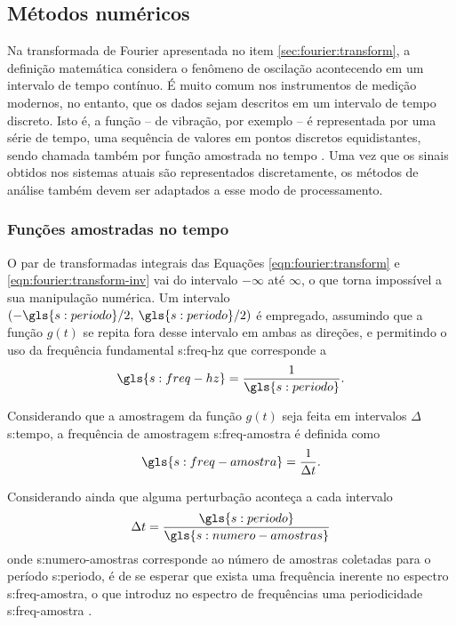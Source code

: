 \documentclass[12pt,oneside,english,brazil,lmodern,siglas,simbolos,cite=num]{ucsmonograph}
\begin{document}
	\subsection{Métodos numéricos}
	Na transformada de Fourier apresentada no item \ref{sec:fourier:transform}, a definição matemática considera o fenômeno de oscilação acontecendo em um intervalo de tempo contínuo.
	É muito comum nos instrumentos de medição modernos, no entanto, que os dados sejam descritos em um intervalo de tempo discreto.
	Isto é, a função -- de vibração, por exemplo -- é representada por uma série de tempo, uma sequência de valores em pontos discretos equidistantes, sendo chamada também por função amostrada no tempo \cite{dimarogonas:1995}.
	Uma vez que os sinais obtidos nos sistemas atuais são representados discretamente, os métodos de análise também devem ser adaptados a esse modo de processamento.
	
	\subsubsection{Funções amostradas no tempo}
	O par de transformadas integrais das Equações \ref{eqn:fourier:transform} e \ref{eqn:fourier:transform-inv} vai do intervalo $ -\infty $ até $ \infty $, o que torna impossível a sua manipulação numérica.
	Um intervalo $ (-\gls{s:periodo}/2,\:\gls{s:periodo}/2) $ é empregado, assumindo que a função $g(t)$ se repita fora desse intervalo em ambas as direções, e permitindo o uso da frequência fundamental \gls{s:freq-hz} que corresponde a \cite{dimarogonas:1995}
	\begin{equation} \label{eqn:fourier:freq-fundam}
		\gls{s:freq-hz} = \frac{1}{\gls{s:periodo}}.
	\end{equation}
	
	Considerando que a amostragem da função $g(t)$ seja feita em intervalos $ \Delta $\gls{s:tempo}, a frequência de amostragem \gls{s:freq-amostra} é definida como \cite{dimarogonas:1995}
	\begin{equation} \label{eqn:fourier:freq-amostra}
		\gls{s:freq-amostra} = \frac{1}{\Delta t}.
	\end{equation}
	
	Considerando ainda que alguma perturbação aconteça a cada intervalo \[\Delta t = \frac{\gls{s:periodo}}{\gls{s:numero-amostras}} \] onde \gls{s:numero-amostras} corresponde ao número de amostras coletadas para o período \gls{s:periodo}, é de se esperar que exista uma frequência inerente no espectro \gls{s:freq-amostra}, o que introduz no espectro de frequências uma periodicidade \gls{s:freq-amostra} \cite{dimarogonas:1995}.
	
\end{document}
